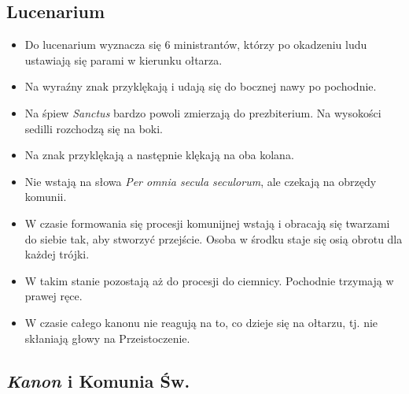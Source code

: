 \subsection{Lucenarium}

\begin{itemize}
      \item Do lucenarium wyznacza się 6 ministrantów, którzy po okadzeniu ludu
            ustawiają się parami w kierunku ołtarza.
      \item Na wyraźny znak  przyklękają i udają się do bocznej nawy po
            pochodnie.
      \item Na śpiew \textit{Sanctus} bardzo powoli zmierzają do prezbiterium. Na
            wysokości sedilli rozchodzą się na boki.
      \item Na znak  przyklękają a następnie klękają na oba kolana.
      \item Nie wstają na słowa \textit{Per omnia secula seculorum}, ale czekają na
            obrzędy komunii.
      \item W czasie formowania się procesji komunijnej wstają i obracają się
            twarzami do siebie tak, aby stworzyć przejście. Osoba w środku staje
            się osią obrotu dla każdej trójki.
      \item W takim stanie pozostają aż do procesji do ciemnicy. Pochodnie
            trzymają w prawej ręce.
      \item W czasie całego kanonu nie reagują na to, co dzieje się na ołtarzu,
            tj. nie skłaniają głowy na Przeistoczenie.
\end{itemize}

\subsection{\textit{Kanon} i Komunia Św.}


